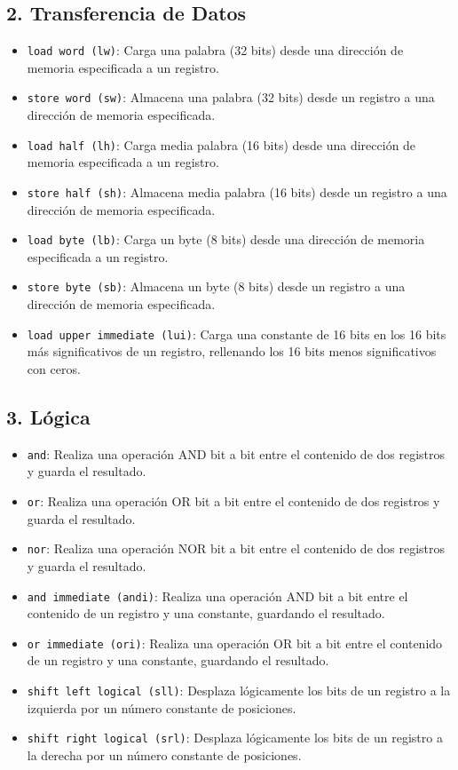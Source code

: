 \documentclass{article}
\begin{document}
\subsection*{2. Transferencia de Datos}
\begin{itemize}
    \item \texttt{load word (lw)}: Carga una palabra (32 bits) desde una dirección de memoria especificada a un registro.
    \item \texttt{store word (sw)}: Almacena una palabra (32 bits) desde un registro a una dirección de memoria especificada.
    \item \texttt{load half (lh)}: Carga media palabra (16 bits) desde una dirección de memoria especificada a un registro.
    \item \texttt{store half (sh)}: Almacena media palabra (16 bits) desde un registro a una dirección de memoria especificada.
    \item \texttt{load byte (lb)}: Carga un byte (8 bits) desde una dirección de memoria especificada a un registro.
    \item \texttt{store byte (sb)}: Almacena un byte (8 bits) desde un registro a una dirección de memoria especificada.
    \item \texttt{load upper immediate (lui)}: Carga una constante de 16 bits en los 16 bits más significativos de un registro, rellenando los 16 bits menos significativos con ceros.
\end{itemize}

\subsection*{3. Lógica}
\begin{itemize}
    \item \texttt{and}: Realiza una operación AND bit a bit entre el contenido de dos registros y guarda el resultado.
    \item \texttt{or}: Realiza una operación OR bit a bit entre el contenido de dos registros y guarda el resultado.
    \item \texttt{nor}: Realiza una operación NOR bit a bit entre el contenido de dos registros y guarda el resultado.
    \item \texttt{and immediate (andi)}: Realiza una operación AND bit a bit entre el contenido de un registro y una constante, guardando el resultado.
    \item \texttt{or immediate (ori)}: Realiza una operación OR bit a bit entre el contenido de un registro y una constante, guardando el resultado.
    \item \texttt{shift left logical (sll)}: Desplaza lógicamente los bits de un registro a la izquierda por un número constante de posiciones.
    \item \texttt{shift right logical (srl)}: Desplaza lógicamente los bits de un registro a la derecha por un número constante de posiciones.
\end{itemize}
\end{document}
